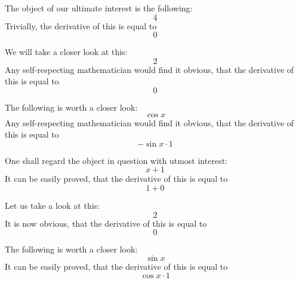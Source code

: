 \documentclass{article}
\begin{document}
The object of our ultimate interest is the following:
\begin{equation}
4 
\end{equation}
Trivially, the derivative of this is equal to
\begin{equation}
0 
\end{equation}

We will take a closer look at this:
\begin{equation}
2 
\end{equation}
Any self-respecting mathematician would find it obvious, that the derivative of this is equal to
\begin{equation}
0 
\end{equation}

The following is worth a closer look:
\begin{equation}
\cos x 
\end{equation}
Any self-respecting mathematician would find it obvious, that the derivative of this is equal to
\begin{equation}
-\sin x \cdot 1 
\end{equation}

One shall regard the object in question with utmost interest:
\begin{equation}
x + 1 
\end{equation}
It can be easily proved, that the derivative of this is equal to
\begin{equation}
1 + 0 
\end{equation}

Let us take a look at this:
\begin{equation}
2 
\end{equation}
It is now obvious, that the derivative of this is equal to
\begin{equation}
0 
\end{equation}

The following is worth a closer look:
\begin{equation}
\sin x 
\end{equation}
It can be easily proved, that the derivative of this is equal to
\begin{equation}
\cos x \cdot 1 
\end{equation}
\end{document}
